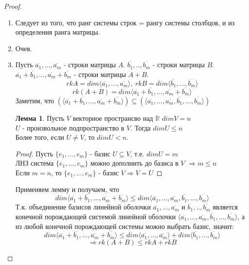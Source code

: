 \documentclass[a4paper, 12pt]{article}
\newcommand{\R}{\mathbb R}
\newcommand\tab[1][.5cm]{\hspace*{#1}}
\theoremstyle{definition}
\newtheorem*{lemma}{Лемма}
\begin{document}
  \begin{proof} \tab
    \begin{enumerate} 
      \item Следует из того, что ранг системы строк = рангу системы столбцов, и из определения ранга матрицы.
      \item Очев. 
      \item Пусть $\overline{a_1},...,\overline{a_m}$ - строки матрицы $A$. $\overline{b_1},..,\overline{b_m}$  - строки матрицы $B$. \\
      $\overline{a_1} + \overline{b_1} ,..., \overline{a_m} + \overline{b_m}$ - строки матрицы $A+B$. 
      $$rkA = dim \langle \overline{a_1},...,\overline{a_m} \rangle, \ rkB = dim \langle \overline{b_1},...,\overline{b_m} \rangle$$   
      $$rk(A+B) = dim \langle \overline{a_1} + \overline{b_1} ,..., \overline{a_m} + \overline{b_m} \rangle$$ 
      Заметим, что $(\langle \overline{a_1} + \overline{b_1} ,..., \overline{a_m} + \overline{b_m} \rangle) \subseteq (\langle \overline{a_1},...,\overline{a_m}, \overline{b_1},...,\overline{b_m} \rangle)$   
      \begin{lemma}
        Пусть $V$ векторное пространсво над $\R$ $dimV = n$  \\
        $U$ -  произвольное подпространство в $V$. Тогда $dimU\leq n$ \\
        Более того, если $U \neq V$, то $dimU<n$.
      \end{lemma} 
      \begin{proof} 
        Пусть $\{e_1,...,e_m\}$ - базис $U \subseteq V$, т.е. $dimU = m$ \\
        ЛНЗ система $\{e_1,...,e_m\}$ можно дополнить до базиса в $V$ $\Longrightarrow m\leq n$  \\
        Если $m = n$, то $\{e_1,...,e_m\}$ - базис $V \Longrightarrow V=U$
      \end{proof} 
      Применяем лемму и получаем, что 
      $$dim\langle \overline{a_1} + \overline{b_1} ,..., \overline{a_m} + \overline{b_m} \rangle \leq dim\langle \overline{a_1},...,\overline{a_m}, \overline{b_1},...,\overline{b_m} \rangle$$ 
      Т.к. объединение базисов линейной оболочки $\overline{a_1},...,\overline{a_m}$ и $\overline{b_1},..,\overline{b_m}$ является конечной порождающей системой линейной оболочки $\langle \overline{a_1},...,\overline{a_m}, \overline{b_1},...,\overline{b_m} \rangle$, а из любой конечной порождающей системы можно выбрать базис, значит: $$dim\langle \overline{a_1} + \overline{b_1} ,..., \overline{a_m} + \overline{b_m} \rangle \leq dim\langle \overline{a_1},...,\overline{a_m} \rangle + dim\langle \overline{b_1},...,\overline{b_m} \rangle$$ $$\Longrightarrow  rk(A+B) \leq rkA + rkB$$

\end{enumerate}
\end{proof}
\end{document}
